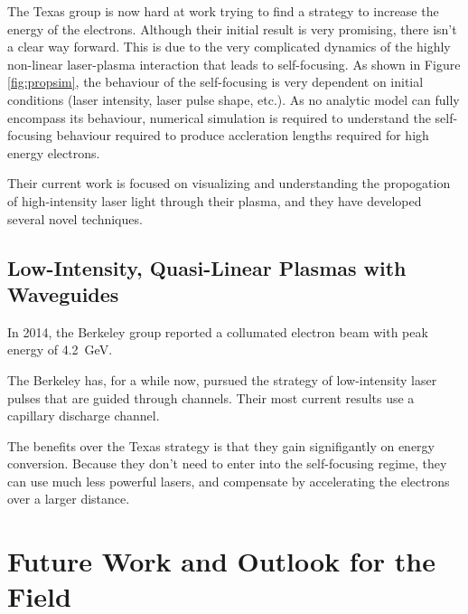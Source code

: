 \documentclass[12pt, titlepage]{article}
\begin{document}
The Texas group is now hard at work trying to find a strategy to increase the
energy of the electrons. Although their initial result is very promising, there
isn't a clear way forward. This is due to the very complicated dynamics of the
highly non-linear laser-plasma interaction that leads to self-focusing. As
shown in Figure \ref{fig:propsim}, the behaviour of the self-focusing is very
dependent on initial conditions (laser intensity, laser pulse shape, etc.). As
no analytic model can fully encompass its behaviour, numerical simulation is
required to understand the self-focusing behaviour required to produce
accleration lengths required for high energy electrons.

Their current work is focused on visualizing and understanding the propogation
of high-intensity laser light through their plasma, and they have developed
several novel techniques.


\subsection{Low-Intensity, Quasi-Linear Plasmas with Waveguides}
In 2014, the Berkeley group reported a collumated electron beam with peak
energy of \SI{4.2}{\giga \electronvolt}.

The Berkeley has, for a while now, pursued the strategy of low-intensity laser
pulses that are guided through channels. Their most current results use a
capillary discharge channel. 

The benefits over the Texas strategy is that they gain signifigantly on energy
conversion. Because they don't need to enter into the self-focusing regime,
they can use much less powerful lasers, and compensate by accelerating the
electrons over a larger distance. 
\section{Future Work and Outlook for the Field}
\end{document}
